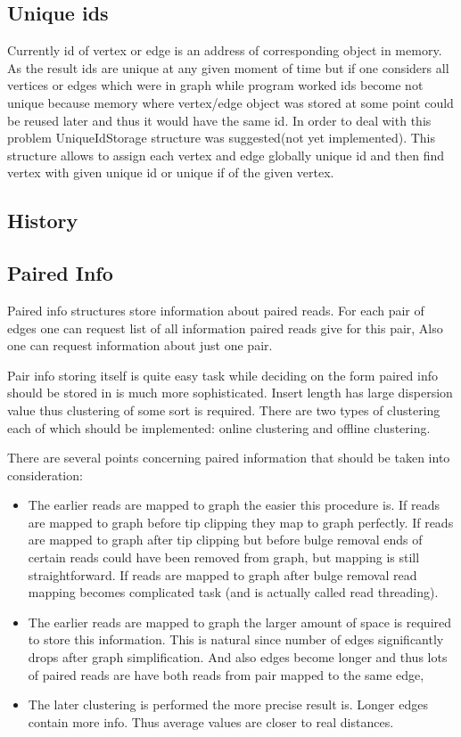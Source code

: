 \documentclass[12pt]{article}
\begin{document}
\subsection{Unique ids}

Currently id of vertex or edge is an address of corresponding object in memory. As the result ids are unique at any given moment of time but if one considers all vertices or edges which were in graph while program worked ids become not unique because memory where vertex/edge object was stored at some point could be reused later and thus it would have the same id. In order to deal with this problem UniqueIdStorage structure was suggested(not yet implemented). This structure allows to assign each vertex and edge globally unique id and then find vertex with given unique id or unique if of the given vertex.

\subsection{History}

\subsection{Paired Info}

Paired info structures store information about paired reads. For each pair of edges one can request list of all information paired reads give for this pair, Also one can request information about just one pair.

Pair info storing itself is quite easy task while deciding on the form paired info should be stored in is much more sophisticated. Insert length has large dispersion value thus clustering of some sort is required. There are two types of clustering each of which should be implemented: online clustering and offline clustering.

There are several points concerning paired information that should be taken into consideration:

\begin{itemize}
\item The earlier reads are mapped to graph the easier this procedure is. If reads are mapped to graph before tip clipping they map to graph perfectly. If reads are mapped to graph after tip clipping but before bulge removal ends of certain reads could have been removed from graph, but mapping is still straightforward. If reads are mapped to graph after bulge removal read mapping becomes complicated task (and is actually called read threading).

\item The earlier reads are mapped to graph the larger amount of space is required to store this information. This is natural since number of edges significantly drops after graph simplification. And also edges become longer and thus lots of paired reads are have both reads from pair mapped to the same edge,

\item The later clustering is performed the more precise result is. Longer edges contain more info. Thus average values are closer to real distances.
\end{itemize}
\end{document}
